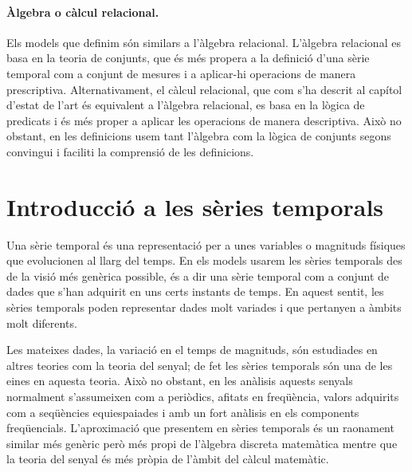 \paragraph{Àlgebra o càlcul relacional.} Els models que definim són
similars a l'àlgebra relacional. L'àlgebra relacional es basa en la
teoria de conjunts, que és més propera a la definició d'una sèrie
temporal com a conjunt de mesures i a aplicar-hi operacions de manera
prescriptiva. Alternativament, el càlcul relacional, que com s'ha
descrit al capítol d'estat de l'art  és equivalent a
l'àlgebra relacional, es basa en la lògica de predicats i és més
proper a aplicar les operacions de manera descriptiva. Això no
obstant, en les definicions usem tant l'àlgebra com la lògica de
conjunts segons convingui i faciliti la comprensió de les definicions.











\section{Introducció a les sèries temporals}


Una sèrie temporal és una representació per a unes variables o
magnituds físiques que evolucionen al llarg del temps.  En els models
usarem les sèries temporals des de la visió més genèrica possible, és
a dir una sèrie temporal com a conjunt de dades que s'han adquirit en
uns certs instants de temps.  En aquest sentit, les sèries temporals
poden representar dades molt variades i que pertanyen a àmbits molt
diferents.


Les mateixes dades, la variació en el temps de magnituds, són
estudiades en altres teories com la teoria del senyal; de fet les
sèries temporals són una de les eines en aquesta teoria.  Això no
obstant, en les anàlisis aquests senyals normalment s'assumeixen com a
periòdics, afitats en freqüència, valors adquirits com a seqüències
equiespaiades i amb un fort anàlisis en els components freqüencials.
L'aproximació que presentem en sèries temporals és un raonament
similar més genèric però més propi de l'àlgebra discreta matemàtica
mentre que la teoria del senyal és més pròpia de l'àmbit del càlcul
matemàtic. 


